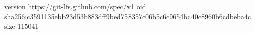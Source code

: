 version https://git-lfs.github.com/spec/v1
oid sha256:c3591135ebb23d53b883dff9bed758357c06b5c6c9654bc40c8960b6cdbeba4c
size 115041
